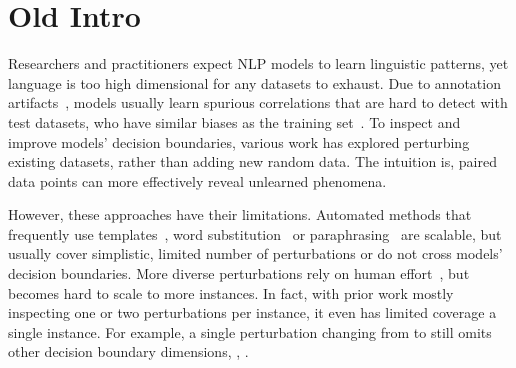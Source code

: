 
\section{Old Intro}




Researchers and practitioners expect NLP models to learn linguistic patterns, yet language is too high dimensional for any datasets to exhaust.
Due to annotation artifacts~\cite{gururangan2018annotation}, models usually learn spurious correlations that are hard to detect with test datasets, who have similar biases as the training set~\cite{rajpurkar-etal-2018-know}.
To inspect and improve models' decision boundaries, various work has explored perturbing existing datasets, rather than adding new random data.
The intuition is, paired data points can more effectively reveal unlearned phenomena. 


However, these approaches have their limitations. 
Automated methods that frequently use templates~\cite{li2020linguistically}, word substitution~\cite{li-etal-2020-bert-attack} or paraphrasing~\cite{iyyer2018adversarial} are scalable, but usually cover simplistic, limited number of perturbations or do not cross models' decision boundaries.
More diverse perturbations rely on human effort~\cite{gardner2020contrast, kaushik2019learning}, but becomes hard to scale to more instances.
In fact, with prior work mostly inspecting one or two perturbations per instance, it even has limited coverage a single instance.
For example, a single perturbation changing from  to  still omits other decision boundary dimensions, \eg {},  .

